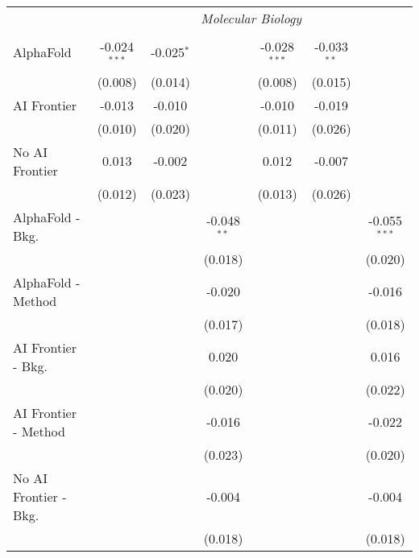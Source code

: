 \begin{tabular}{lcccccc}
 & \multicolumn{6}{c}{\textit{Molecular Biology}} \\ \\
   AlphaFold               & -0.024$^{***}$ & -0.025$^{*}$ &               & -0.028$^{***}$ & -0.033$^{**}$ &   \\   
                           & (0.008)        & (0.014)      &               & (0.008)        & (0.015)       &   \\   
   AI Frontier             & -0.013         & -0.010       &               & -0.010         & -0.019        &   \\   
                           & (0.010)        & (0.020)      &               & (0.011)        & (0.026)       &   \\   
   No AI Frontier          & 0.013          & -0.002       &               & 0.012          & -0.007        &   \\   
                           & (0.012)        & (0.023)      &               & (0.013)        & (0.026)       &   \\   
   AlphaFold - Bkg.        &                &              & -0.048$^{**}$ &                &               & -0.055$^{***}$\\   
                           &                &              & (0.018)       &                &               & (0.020)\\   
   AlphaFold - Method      &                &              & -0.020        &                &               & -0.016\\   
                           &                &              & (0.017)       &                &               & (0.018)\\   
   AI Frontier - Bkg.      &                &              & 0.020         &                &               & 0.016\\   
                           &                &              & (0.020)       &                &               & (0.022)\\   
   AI Frontier - Method    &                &              & -0.016        &                &               & -0.022\\   
                           &                &              & (0.023)       &                &               & (0.020)\\   
   No AI Frontier - Bkg.   &                &              & -0.004        &                &               & -0.004\\   
                           &                &              & (0.018)       &                &               & (0.018)\\   

\end{tabular}
